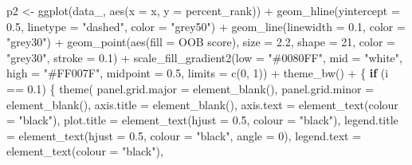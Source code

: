 \documentclass[
  11pt,
  oneside]{book}
\newenvironment{Shaded}{\begin{snugshade}}{\end{snugshade}}
\newcommand{\AttributeTok}[1]{\textcolor[rgb]{0.77,0.63,0.00}{#1}}
\newcommand{\ControlFlowTok}[1]{\textcolor[rgb]{0.13,0.29,0.53}{\textbf{#1}}}
\newcommand{\DecValTok}[1]{\textcolor[rgb]{0.00,0.00,0.81}{#1}}
\newcommand{\FloatTok}[1]{\textcolor[rgb]{0.00,0.00,0.81}{#1}}
\newcommand{\FunctionTok}[1]{\textcolor[rgb]{0.00,0.00,0.00}{#1}}
\newcommand{\NormalTok}[1]{#1}
\newcommand{\OtherTok}[1]{\textcolor[rgb]{0.56,0.35,0.01}{#1}}
\newcommand{\SpecialCharTok}[1]{\textcolor[rgb]{0.00,0.00,0.00}{#1}}
\newcommand{\StringTok}[1]{\textcolor[rgb]{0.31,0.60,0.02}{#1}}
\begin{document}
\begin{Shaded}
\begin{Highlighting}[]
\NormalTok{  p2 }\OtherTok{\textless{}{-}} \FunctionTok{ggplot}\NormalTok{(data\_, }\FunctionTok{aes}\NormalTok{(}\AttributeTok{x =}\NormalTok{ x, }\AttributeTok{y =} \StringTok{\textasciigrave{}}\AttributeTok{percent\_rank}\StringTok{\textasciigrave{}}\NormalTok{)) }\SpecialCharTok{+}
    \FunctionTok{geom\_hline}\NormalTok{(}\AttributeTok{yintercept =} \FloatTok{0.5}\NormalTok{, }\AttributeTok{linetype =} \StringTok{"dashed"}\NormalTok{, }\AttributeTok{color =} \StringTok{"grey50"}\NormalTok{) }\SpecialCharTok{+}
    \FunctionTok{geom\_line}\NormalTok{(}\AttributeTok{linewidth =} \FloatTok{0.1}\NormalTok{, }\AttributeTok{color =} \StringTok{"grey30"}\NormalTok{) }\SpecialCharTok{+}
    \FunctionTok{geom\_point}\NormalTok{(}\FunctionTok{aes}\NormalTok{(}\AttributeTok{fill =} \StringTok{\textasciigrave{}}\AttributeTok{OOB score}\StringTok{\textasciigrave{}}\NormalTok{), }\AttributeTok{size =} \FloatTok{2.2}\NormalTok{, }\AttributeTok{shape =} \DecValTok{21}\NormalTok{, }\AttributeTok{color =} \StringTok{"grey30"}\NormalTok{, }\AttributeTok{stroke =} \FloatTok{0.1}\NormalTok{) }\SpecialCharTok{+}
    \FunctionTok{scale\_fill\_gradient2}\NormalTok{(}\AttributeTok{low =} \StringTok{"\#0080FF"}\NormalTok{, }\AttributeTok{mid =} \StringTok{"white"}\NormalTok{, }\AttributeTok{high =} \StringTok{"\#FF007F"}\NormalTok{, }\AttributeTok{midpoint =} \FloatTok{0.5}\NormalTok{, }\AttributeTok{limits =} \FunctionTok{c}\NormalTok{(}\DecValTok{0}\NormalTok{, }\DecValTok{1}\NormalTok{)) }\SpecialCharTok{+}
    \FunctionTok{theme\_bw}\NormalTok{() }\SpecialCharTok{+}
\NormalTok{    \{}
      \ControlFlowTok{if}\NormalTok{ (i }\SpecialCharTok{==} \FloatTok{0.1}\NormalTok{) \{}
        \FunctionTok{theme}\NormalTok{(}
          \AttributeTok{panel.grid.major =} \FunctionTok{element\_blank}\NormalTok{(),}
          \AttributeTok{panel.grid.minor =} \FunctionTok{element\_blank}\NormalTok{(),}
          \AttributeTok{axis.title =} \FunctionTok{element\_blank}\NormalTok{(),}
          \AttributeTok{axis.text =} \FunctionTok{element\_text}\NormalTok{(}\AttributeTok{colour =} \StringTok{"black"}\NormalTok{),}
          \AttributeTok{plot.title =} \FunctionTok{element\_text}\NormalTok{(}\AttributeTok{hjust =} \FloatTok{0.5}\NormalTok{, }\AttributeTok{colour =} \StringTok{"black"}\NormalTok{),}
          \AttributeTok{legend.title =} \FunctionTok{element\_text}\NormalTok{(}\AttributeTok{hjust =} \FloatTok{0.5}\NormalTok{, }\AttributeTok{colour =} \StringTok{"black"}\NormalTok{, }\AttributeTok{angle =} \DecValTok{0}\NormalTok{),}
          \AttributeTok{legend.text =} \FunctionTok{element\_text}\NormalTok{(}\AttributeTok{colour =} \StringTok{"black"}\NormalTok{),}

\end{Highlighting}
\end{Shaded}
\end{document}
